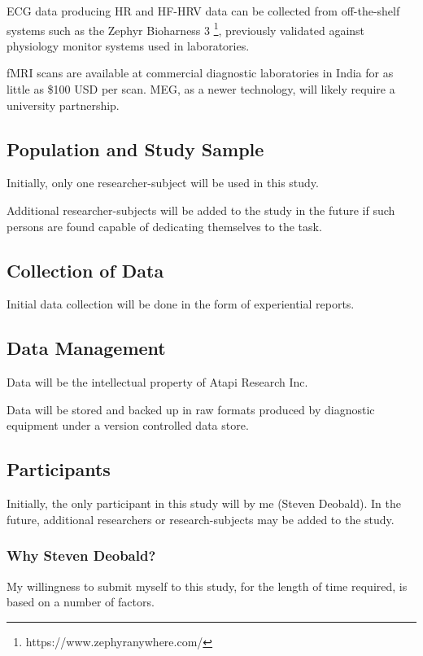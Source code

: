 \documentclass[a4paper, amsfonts, amssymb, amsmath, reprint, showkeys, nofootinbib, twoside]{revtex4-1}
\begin{document}
ECG data producing HR and HF-HRV data can be collected from off-the-shelf
systems such as the Zephyr Bioharness 3 \footnote{https://www.zephyranywhere.com/},
previously validated against physiology monitor systems used in laboratories.
\cite{johnstone2012bioharness}

fMRI scans are available at commercial
diagnostic laboratories in India for as little as \$100 USD per scan.
MEG, as a newer technology, will likely require a university partnership.

\subsection{Population and Study Sample}

Initially, only one researcher-subject will be used in this study.

Additional researcher-subjects will be added to the study in the future
if such persons are found capable of dedicating themselves to the task.

\subsection{Collection of Data}

Initial data collection will be done in the form of experiential reports.

\subsection{Data Management}

Data will be the intellectual property of Atapi Research Inc.

Data will be stored and backed up in raw formats produced by diagnostic
equipment under a version controlled data store.

\subsection{Participants}

Initially, the only participant in this study will by me (Steven Deobald).
In the future, additional researchers or research-subjects may be added
to the study.

\subsubsection{Why Steven Deobald?}

My willingness to submit myself to this study, for the length of time required,
is based on a number of factors.
\end{document}
